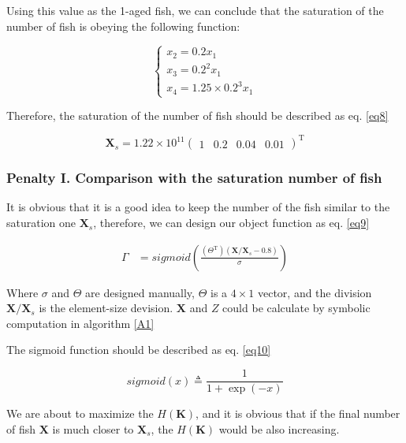 \documentclass{IEEEtran}
\begin{document}
Using this value as the 1-aged fish, we can conclude that the saturation of the number of fish is obeying the following function:

\begin{equation}
    \begin{cases}
        x_2 = 0.2 x_1\\
        x_3 = 0.2^2 x_1\\
        x_4 = 1.25 \times 0.2^3 x_1
    \end{cases}
\end{equation}

Therefore, the saturation of the number of fish should be described as eq. \ref{eq8}

\begin{equation}
    \label{eq8}
    \bm X_s = 1.22 \times 10^{11}\begin{pmatrix}1 & 0.2 & 0.04 & 0.01\end{pmatrix}^\mathrm T
\end{equation}

\subsubsection{Penalty I. Comparison with the saturation number of fish}

It is obvious that it is a good idea to keep the number of the fish similar to the saturation one $\bm X_s$, therefore, we can design our object function as eq. \ref{eq9}

\begin{align}
    \label{eq9}
    \Gamma &= sigmoid(\frac{(\Theta^\mathrm T)(\bm X / \bm X_s - 0.8)}{\sigma})
\end{align}

Where $\sigma$ and $\Theta$ are designed manually, $\Theta$ is a $4 \times 1$ vector, and the division $\bm X / \bm X_s$ is the element-size devision. $\bm X$ and $Z$ could be calculate by symbolic computation in algorithm \ref{A1}

The sigmoid function should be described as eq. \ref{eq10}

\begin{equation}
    \label{eq10}
    sigmoid(x) \triangleq \frac1{1 + \exp(-x)}
\end{equation}

We are about to maximize the $H(\bm K)$, and it is obvious that if the final number of fish $\bm X$ is much closer to $\bm X_s$, the $H(\bm K)$ would be also increasing.
\end{document}
